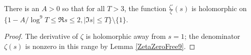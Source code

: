 \begin{lemma}[LogDerivZetaHolcLargeT9]
\label{LogDerivZetaHolcLargeT9}
\leanok
There is an $A>0$ so that for all $T>3$, the function
  $
  \frac {\zeta'}{\zeta}(s)
  $
  is holomorphic on $\{1-A/\log^9 T \le \Re s \le 2, |\Im s|\le T \}\setminus\{1\}$.
\end{lemma}
\begin{proof}
\leanok
The derivative of $\zeta$ is holomorphic away from $s=1$; the denominator $\zeta(s)$ is nonzero
  in this range by Lemma \ref{ZetaZeroFree9}.
\end{proof}
